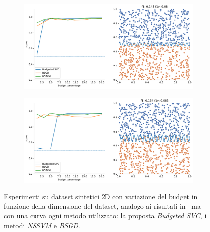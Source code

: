 \begin{figure}
\begin{subfigure}{.5\textwidth}
    \end{subfigure}%
    \hfill
    \begin{subfigure}{.5\textwidth}
        \centering
        \includegraphics[width=\textwidth]{img/comp_new/7.pdf}
    \end{subfigure}
    \begin{subfigure}{.5\textwidth}
        \centering
        \includegraphics[width=\textwidth]{img/comp_new/8.pdf}
    \end{subfigure}
\caption{Esperimenti su dataset sintetici 2D con variazione del budget in funzione della dimensione del dataset, analogo ai risultati in~ ma con una curva ogni metodo utilizzato: la proposta \emph{Budgeted SVC}, i metodi \emph{NSSVM} e \emph{BSGD}.}
\label{fig:comp_new_1}
\end{figure}   
